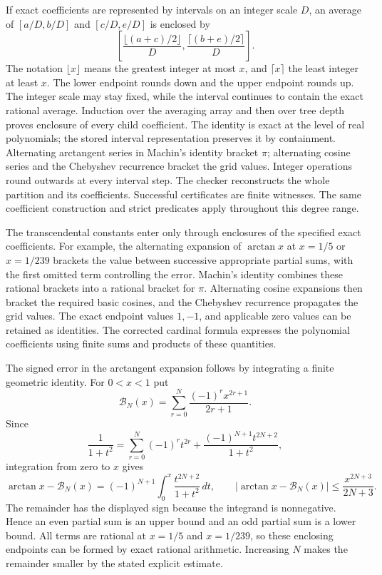 If exact coefficients are represented by intervals on an integer scale
$D$, an average of $[a/D,b/D]$ and $[c/D,e/D]$ is enclosed by
\[
 \left[\frac{\lfloor(a+c)/2\rfloor}{D},
       \frac{\lceil(b+e)/2\rceil}{D}\right].
\]
The notation $\lfloor x\rfloor$ means the greatest integer at most
$x$, and $\lceil x\rceil$ the least integer at least $x$.
The lower endpoint rounds down and the upper endpoint rounds up. The
integer scale may stay fixed, while the interval continues to contain
the exact rational average. Induction over the averaging array and
then over tree depth proves enclosure of every child coefficient.
The identity is exact at the level of real polynomials; the stored
interval representation preserves it by containment.
 Alternating arctangent
series in Machin's identity bracket $\pi$; alternating cosine series and
the Chebyshev recurrence bracket the grid values. Integer operations round
outwards at every interval step. The checker reconstructs the whole
partition and its coefficients. Successful certificates are finite witnesses.
The same coefficient construction and strict predicates apply throughout
this degree range.

The transcendental constants enter only through enclosures of the
specified exact coefficients. For example, the alternating expansion
of $\arctan x$ at $x=1/5$ or $x=1/239$ brackets the value between
successive appropriate partial sums, with the first omitted term
controlling the error. Machin's identity combines these rational
brackets into a rational bracket for $\pi$. Alternating cosine
expansions then bracket the required basic cosines, and the Chebyshev
recurrence propagates the grid values. The exact endpoint values
$1,-1$, and applicable zero values can be retained as identities.
The corrected cardinal formula expresses the polynomial coefficients
using finite sums and products of these quantities.

The signed error in the arctangent expansion follows by integrating
a finite geometric identity. For $0<x<1$ put
\[
 \mathcal B_N(x)=\sum_{r=0}^N\frac{(-1)^r x^{2r+1}}{2r+1}.
\]
Since
\[
 \frac1{1+t^2}=\sum_{r=0}^N(-1)^r t^{2r}
                  +\frac{(-1)^{N+1}t^{2N+2}}{1+t^2},
\]
integration from zero to $x$ gives
\[
 \arctan x-\mathcal B_N(x)=(-1)^{N+1}
                  \int_0^x\frac{t^{2N+2}}{1+t^2}\,dt,
 \qquad
 |\arctan x-\mathcal B_N(x)|\leq\frac{x^{2N+3}}{2N+3}.
\]
The remainder has the displayed sign because the integrand is
nonnegative. Hence an even partial sum is an upper bound and an
odd partial sum is a lower bound. All terms are rational at
$x=1/5$ and $x=1/239$, so these enclosing endpoints can be formed
by exact rational arithmetic. Increasing $N$ makes the remainder
smaller by the stated explicit estimate.

